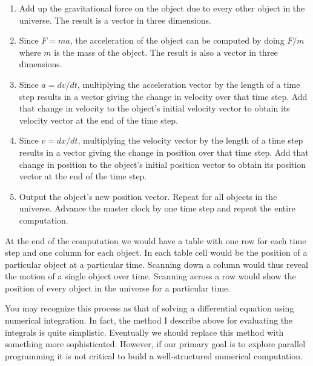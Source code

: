 \begin{enumerate}

\item Add up the gravitational force on the object due to every other object in the universe.
  The result is a vector in three dimensions.

\item Since $F = ma$, the acceleration of the object can be computed by doing $F/m$ where $m$ is
  the mass of the object. The result is also a vector in three dimensions.

\item Since $a = dv/dt$, multiplying the acceleration vector by the length of a time step
  results in a vector giving the change in velocity over that time step. Add that change in
  velocity to the object's initial velocity vector to obtain its velocity vector at the end of
  the time step.

\item Since $v = dx/dt$, multiplying the velocity vector by the length of a time step results in
  a vector giving the change in position over that time step. Add that change in position to the
  object's initial position vector to obtain its position vector at the end of the time step.

\item Output the object's new position vector. Repeat for all objects in the universe. Advance the
  master clock by one time step and repeat the entire computation.

\end{enumerate}

At the end of the computation we would have a table with one row for each time step and one
column for each object. In each table cell would be the position of a particular object at a
particular time. Scanning down a column would thus reveal the motion of a single object over
time. Scanning across a row would show the position of every object in the universe for a
particular time.

You may recognize this process as that of solving a differential equation using numerical
integration. In fact, the method I describe above for evaluating the integrals is quite
simplistic. Eventually we should replace this method with something more sophisticated. However,
if our primary goal is to explore parallel programming it is not critical to build a
well-structured numerical computation.
